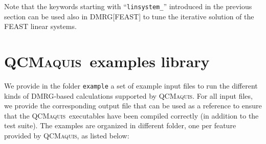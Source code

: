 \documentclass[bibliography=totoc,12pt,a4paper]{scrartcl}
\newcommand{\qcm}{\textsc{QCMaquis}}
\begin{document}
Note that the keywords starting with ``\texttt{linsystem\_}'' introduced in the previous section can be used also in DMRG[FEAST] to tune the iterative solution of the FEAST linear systems.

\section{\qcm\ examples library}
\label{sec:examples}

We provide in the folder \texttt{example} a set of example input files to run the different kinds of DMRG-based calculations supported by \qcm.
For all input files, we provide the corresponding output file that can be used as a reference to ensure that the \qcm\ executables have been compiled correctly (in addition to the test suite).
The examples are organized in different folder, one per feature provided by \qcm, as listed below:
\end{document}
